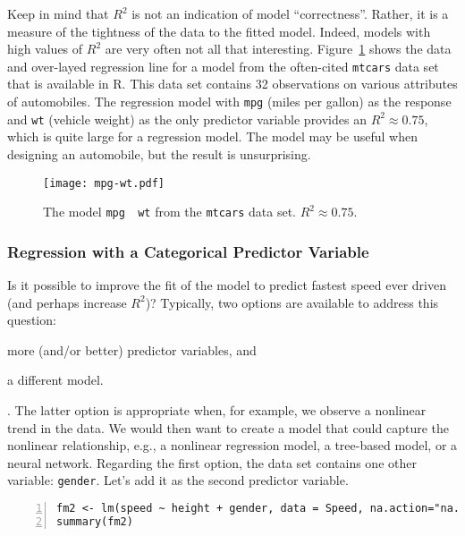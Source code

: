 Keep in mind that $R^2$ is not an indication of model
``correctness''. Rather, it is a measure of the tightness of the
data to the fitted model. Indeed, models with high values of $R^2$ are very
often not all that interesting. Figure~\ref{fig:mpg-wt} shows the data
and over-layed regression line for a model from the often-cited
\texttt{mtcars} data set that is available in R. This data set
contains 32 observations on various attributes of automobiles. The
regression model with \texttt{mpg} (miles per gallon) as the response
and \texttt{wt} (vehicle weight) as the only predictor variable
provides an $R^2 \approx 0.75$, which is quite large for a regression
model. The model may be useful when designing an automobile, but the
result is unsurprising.

\begin{figure}
\begin{center}
\texttt{[image: mpg-wt.pdf]}
\caption{The model \texttt{mpg~\mtilde~wt} from the \texttt{mtcars} data set. 
$R^2 \approx 0.75$.}
\label{fig:mpg-wt}
\end{center}
\end{figure}

\subsubsection*{Regression with a Categorical Predictor Variable}

Is it possible to improve the fit of the model to predict fastest
speed ever driven (and perhaps increase $R^2$)? Typically, two options
are available to address this question:
\begin{inparaenum}[1)] \item more (and/or better) predictor variables,
  and \item a different model.\end{inparaenum}. The latter option is
appropriate when, for example, we observe a nonlinear trend in the
data. We would then want to create a model that could capture the
nonlinear relationship, e.g., a nonlinear regression model, a
tree-based model, or a neural network. Regarding the first option, the
data set contains one other variable: \texttt{gender}. Let's add it as
the second predictor variable.

\begin{Verbatim}[numbers=left,xleftmargin=5mm,samepage=true]
fm2 <- lm(speed ~ height + gender, data = Speed, na.action="na.exclude")
summary(fm2)
\end{Verbatim}

